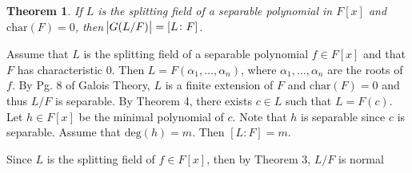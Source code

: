 \documentclass{article}
\makeatletter
\newtheorem{theorem}{Theorem}
\theoremstyle{definition}
\theoremstyle{remark}
\let\oldproofname=\proofname
\renewcommand{\proofname}{\textit{\oldproofname}}
\theoremstyle{definition}
\renewenvironment{proof}[1][\proofname]{\par
  \pushQED{\qed}%
  \normalfont \topsep6\p@\@plus6\p@\relax
  \list{}{\leftmargin=0mm
          \rightmargin=0mm
          \settowidth{\itemindent}{\itshape#1}%
          \labelwidth=\itemindent
          \parsep=0pt \listparindent=0mm%
  }
  \item[\hskip\labelsep
        \itshape
    #1\@addpunct{.}]\ignorespaces
}{%
  \popQED\endlist\@endpefalse
}
\makeatother
\begin{document}
    \begin{theorem}
        If $L$ is the splitting field of a separable polynomial in $F[x]$ and $\text{char}(F)=0$, then $\abs{G(L/F)}=[L\colon F]$.
    \end{theorem}
        \begin{proof}
            Assume that $L$ is the splitting field of a separable polynomial $f\in F[x]$ and that $F$ has characteristic 0. Then $L=F(\alpha_1,\dots,\alpha_n)$, where $\alpha_1,\dots,\alpha_n$ are the roots of $f$. By Pg. 8 of Galois Theory, $L$ is a finite extension of $F$ and $\text{char}(F)=0$ and thus $L/F$ is separable. By Theorem 4, there exists $c\in L$ such that $L=F(c)$. Let $h\in F[x]$ be the minimal polynomial of $c$. Note that $h$ is separable since $c$ is separable. Assume that $\text{deg}(h)=m$. Then $[L\colon F]=m$.\par\hspace{4mm} Since $L$ is the splitting field of $f\in F[x]$, then by Theorem 3, $L/F$ is normal
        \end{proof}
\end{document}
